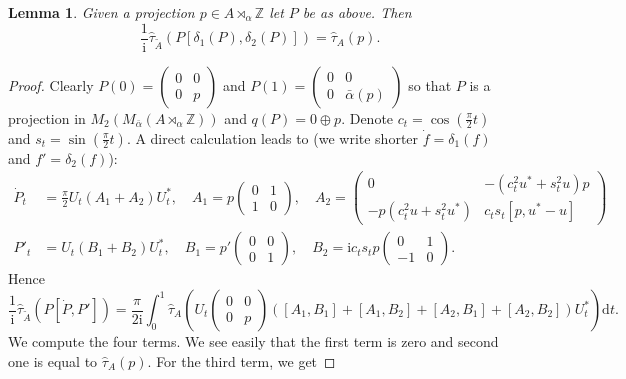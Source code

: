 \documentclass[11pt]{amsart}
\newtheorem{lemma}{Lemma}[section]
\begin{document}
\begin{lemma}\label{lem-tr-ch}
Given a projection $p\in A \rtimes_\alpha \mathbb{Z}$ let $P$ be as above.
Then 
\begin{equation}\label{eq-tr-ch}
\frac1{\mathrm{i}}\hat{\tau}_{\tilde{A}}(P[\delta_1(P), \delta_2(P)])
=\hat{\tau}_A(p).
\end{equation}
\end{lemma}
\begin{proof} 
Clearly $P(0)=\begin{pmatrix}
		0 & 0\\
		0 & p
	\end{pmatrix}$ and $P(1)=\begin{pmatrix}
		0 & 0\\
		0 & \bar{\alpha}(p)
	\end{pmatrix}$ so that $P$ is a projection in $M_2(M_{\bar{\alpha}}(A \rtimes_\alpha \mathbb{Z}))$ and $q(P)=0 \oplus p$. 
	Denote $c_t=\cos{(\frac{\pi}{2}t)}$ and $s_t=\sin{(\frac{\pi}{2}t)}$. A direct calculation leads to (we write shorter $\dot f=\delta_1(f)$ and $f' = \delta_2(f)$): 
	\begin{align*} 
		\dot{P}_t &=  \frac{\pi}{2}U_t (A_1+A_2)U_t^*,\quad A_1=p\begin{pmatrix}
			0 & 1\\ 
			1 & 0
		\end{pmatrix}, \quad A_2=\begin{pmatrix}
			0 & -(c_t^2u^*+s_t^2u)p\\ 
			-p(c_t^2u+s_t^2u^*) & c_t s_t[p,u^*-u]
		\end{pmatrix}\\
		P'_t &= U_t (B_1+B_2)U_t^*,\quad B_1=p'\begin{pmatrix}
			0 & 0\\ 
			0 & 1
		\end{pmatrix}, \quad B_2=\mathrm{i}c_t s_t p\begin{pmatrix}
			0 & 1\\ 
			-1 & 0
		\end{pmatrix}.
	\end{align*}
	Hence
	$$\frac{1}{\mathrm{i}}\hat{\tau}_{\tilde{A}}(P[\dot{P}, P'])=\frac{\pi}{2\mathrm{i}}\int_0^1\hat{\tau}_A\left( U_t \begin{pmatrix}
		0 & 0\\ 0 & p
	\end{pmatrix} ([A_1,B_1]+ [A_1,B_2]+[A_2,B_1]+[A_2,B_2])U_t^*\right)\mathrm{d}t.$$
	We compute the four terms. We see easily that the first term is zero and second one is equal to $\hat{\tau}_A(p)$. For the third term, we get

\end{proof}
\end{document}
